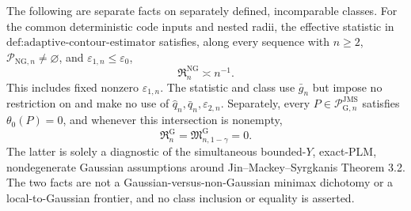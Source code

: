 The following are separate facts on separately defined, incomparable classes.  For the common deterministic code inputs and nested radii, the effective statistic in \(\text{def:adaptive-contour-estimator}\) satisfies, along every sequence with \(n\ge2\), \(\mathcal P_{\mathrm{NG},n}\neq\varnothing\), and \(\varepsilon_{1,n}\le\varepsilon_0\),
\[
 \mathfrak R_n^{\mathrm{NG}}\asymp n^{-1}.
\]
This includes fixed nonzero \(\varepsilon_{1,n}\).  The statistic and class use \(\bar g_n\) but impose no restriction on and make no use of \(\widehat q_n,\bar q_n,\varepsilon_{2,n}\).  Separately, every \(P\in\mathcal P_{\mathrm G,n}^{\mathrm{JMS}}\) satisfies \(\theta_0(P)=0\), and whenever this intersection is nonempty,
\[
 \mathfrak R_n^{\mathrm G}=\mathfrak M_{n,1-\gamma}^{\mathrm G}=0.
\]
The latter is solely a diagnostic of the simultaneous bounded-\(Y\), exact-PLM, nondegenerate Gaussian assumptions around Jin--Mackey--Syrgkanis Theorem 3.2.  The two facts are not a Gaussian-versus-non-Gaussian minimax dichotomy or a local-to-Gaussian frontier, and no class inclusion or equality is asserted.